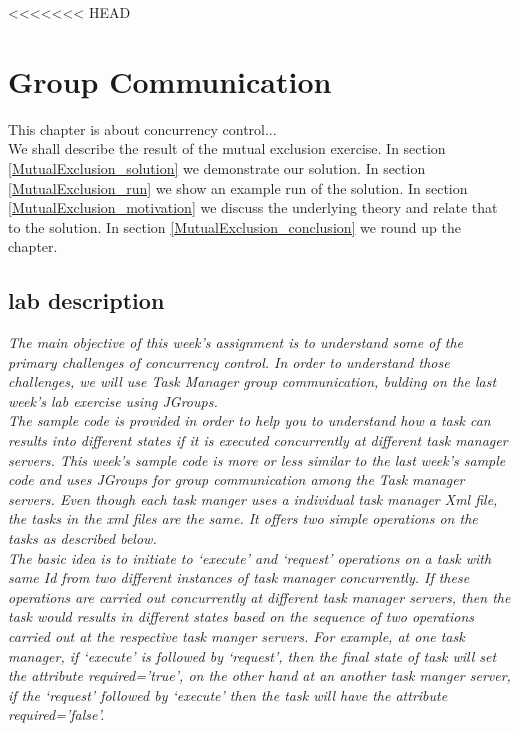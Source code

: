 <<<<<<< HEAD
\chapter{Group Communication}
\minitoc

This chapter is about concurrency control...  \\

We shall describe the result of the mutual exclusion exercise. In section \ref{MutualExclusion_solution} we demonstrate our solution. In section \ref{MutualExclusion_run} we show an example run of the solution. In section \ref{MutualExclusion_motivation} we discuss the underlying theory and relate that to the solution. In section \ref{MutualExclusion_conclusion} we round up the chapter.

\section{lab description}
\textit{The main objective of this week’s assignment is to understand some of the primary challenges of concurrency control. In order to understand those challenges, we will use Task Manager group communication, bulding on the last week’s lab exercise using JGroups.}\\

\textit{The sample code is provided in order to help you to understand how a task can results into different states if it is executed concurrently at different task manager servers. This week’s sample code is more or less similar to the last week’s sample code and uses JGroups for group communication among the Task manager servers. Even though each task manger uses a individual task manager Xml file, the tasks in the xml files are the same. It offers two simple operations on the tasks as described below.}\\



\textit{The basic idea is to initiate to ‘execute’ and ‘request’ operations on a task with same Id from two different instances of task manager concurrently. If these operations are carried out concurrently at different task manager servers, then the task would results in different states based on the sequence of two operations carried out at the respective task manger servers.  For example, at one task manager, if ‘execute’ is followed by ‘request’, then the final state of task will set the attribute required=’true’, on the other hand at an another task manger server, if the ‘request’ followed by ‘execute’ then the task will have the attribute required=’false’.}\\


